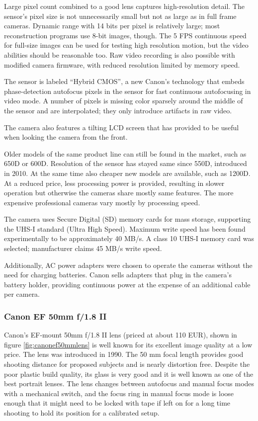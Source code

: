Large pixel count combined to a good lens captures high-resolution detail.
The sensor's pixel size is not unnecessarily small but not as large as in full frame cameras.
Dynamic range with 14 bits per pixel is relatively large; most reconstruction programs use 8-bit images, though.
The 5 FPS continuous speed for full-size images can be used for testing high resolution motion, but the video abilities should be reasonable too.
Raw video recording is also possible with modified camera firmware, with reduced resolution limited by memory speed.

The sensor is labeled ``Hybrid CMOS'', a new Canon's technology that embeds phase-detection autofocus pixels in the sensor for fast continuous autofocusing in video mode.
A number of pixels is missing color sparsely around the middle of the sensor and are interpolated; they only introduce artifacts in raw video.

The camera also features a tilting LCD screen that has provided to be useful when looking the camera from the front.

Older models of the same product line can still be found in the market, such as 650D or 600D.
Resolution of the sensor has stayed same since 550D, introduced in 2010.
At the same time also cheaper new models are available, such as 1200D.
At a reduced price, less processing power is provided, resulting in slower operation but otherwise the cameras share mostly same features.
The more expensive professional cameras vary mostly by processing speed.

The camera uses Secure Digital (SD) memory cards for mass storage, supporting the UHS-I standard (Ultra High Speed).
Maximum write speed has been found experimentally to be approximately 40 MB/s.
A class 10 UHS-I memory card was selected; manufacturer claims 45 MB/s write speed.

Additionally, AC power adapters were chosen to operate the cameras without the need for charging batteries.
Canon sells adapters that plug in the camera's battery holder, providing continuous power at the expense of an additional cable per camera.

\subsubsection{Canon EF 50mm f/1.8 II}

Canon's EF-mount 50mm f/1.8 II lens (priced at about 110 EUR), shown in figure \ref{fig:canonef50mmlens} is well known for its excellent image quality at a low price.
The lens was introduced in 1990.
The 50 mm focal length provides good shooting distance for proposed subjects and is nearly distortion free.
Despite the poor plastic build quality, its glass is very good and it is well known as one of the best portrait lenses.
The lens changes between autofocus and manual focus modes with a mechanical switch, and the focus ring in manual focus mode is loose enough that it might need to be locked with tape if left on for a long time shooting to hold its position for a calibrated setup.

